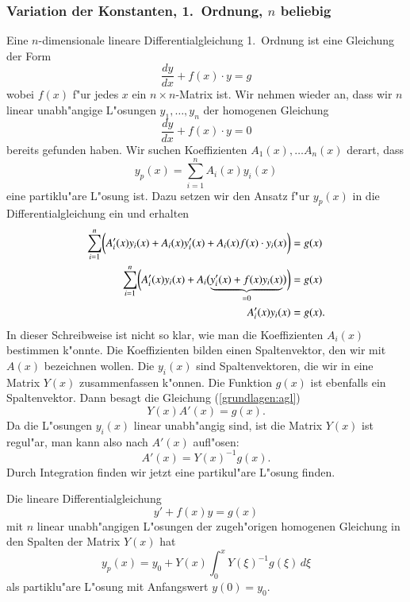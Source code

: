 \subsubsection{Variation der Konstanten, 1.~Ordnung, $n$ beliebig}
Eine $n$-dimensionale lineare Differentialgleichung 1.~Ordnung ist
eine Gleichung der Form
\[
\frac{dy}{dx}+f(x)\cdot y = g
\]
wobei $f(x)$ f"ur jedes $x$ ein $n\times n$-Matrix ist.
Wir nehmen wieder an, dass wir $n$ linear unabh"angige L"osungen
$y_1,\dots,y_n$ der homogenen Gleichung
\[
\frac{dy}{dx}+f(x)\cdot y=0
\]
bereits gefunden haben.
Wir suchen Koeffizienten $A_1(x),\dots A_n(x)$ derart, dass
\[
y_p(x)=\sum_{i=1}^n A_i(x)y_i(x)
\]
eine partiklu"are L"osung ist.
Dazu setzen wir den Ansatz f"ur $y_p(x)$ in die Differentialgleichung
ein und erhalten
\begin{align}
\sum_{i=1}^n\biggl(
A'_i(x)y_i(x) + A_i(x)y_i'(x)
+
A_i(x)f(x)\cdot y_i(x)\biggr)
&=
g(x)
\notag
\\
\sum_{i=1}^n\biggl(
A_i'(x)y_i(x) + A_i\bigl(\underbrace{y_i'(x)+f(x)y_i(x)}_{=0}\bigr)
\biggr)
&=
g(x)
\notag
\\
A_i'(x)y_i(x)&=g(x).
\label{grundlagen:agl}
\end{align}
In dieser Schreibweise ist nicht so klar, wie man die Koeffizienten
$A_i(x)$ bestimmen k"onnte.
Die Koeffizienten bilden einen Spaltenvektor, den wir mit
$A(x)$ bezeichnen wollen. Die $y_i(x)$ sind Spaltenvektoren, die wir
in eine Matrix $Y(x)$ zusammenfassen k"onnen.
Die Funktion $g(x)$ ist ebenfalls ein Spaltenvektor.
Dann besagt die Gleichung (\ref{grundlagen:agl})
\[
Y(x)A'(x)=g(x).
\]
Da die L"osungen $y_i(x)$ linear unabh"angig sind, ist die Matrix
$Y(x)$ ist regul"ar, man kann also nach $A'(x)$ aufl"osen:
\[
A'(x)=Y(x)^{-1}g(x).
\]
Durch Integration finden wir jetzt eine partikul"are L"osung finden.

\begin{satz}
Die lineare Differentialgleichung 
\[
y'+f(x)y=g(x)
\]
mit $n$ linear unabh"angigen L"osungen der zugeh"origen homogenen 
Gleichung in den Spalten der Matrix $Y(x)$ hat
\[
y_p(x)=y_0+Y(x)\int_0^x Y(\xi)^{-1}g(\xi)\,d\xi
\]
als partiklu"are L"osung mit Anfangswert $y(0)=y_0$.
\end{satz}


